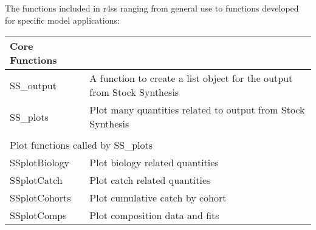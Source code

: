 The functions included in r4ss ranging from general use to functions developed for specific model applications:
\begin{center}
	\begin{longtable}{p{3cm} p{12cm}}
		Core Functions & \\
		\hline
		SS\_output & A function to create a list object for the output from Stock Synthesis\\
		SS\_plots  & Plot many quantities related to output from Stock Synthesis\\
		\hline
		\\
		\multicolumn{2}{l}{Plot functions called by SS\_plots} \\
		\hline
		SSplotBiology & Plot biology related quantities \\
		SSplotCatch   & Plot catch related quantities \\
		SSplotCohorts & Plot cumulative catch by cohort \\
		SSplotComps   & Plot composition data and fits \\
		\hline
	\end{longtable}
\end{center}
